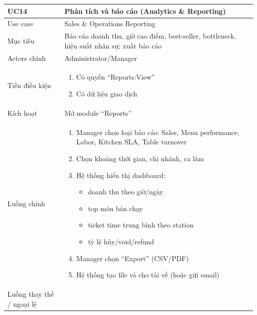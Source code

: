 \begin{longtable}{|>{\raggedright\arraybackslash}p{}|>{\raggedright\arraybackslash}p{}|}
\hline
\textbf{UC14} & \textbf{Phân tích và báo cáo (Analytics \& Reporting)} \\
\hline
Use case & Sales \& Operations Reporting \\
\hline
Mục tiêu & Báo cáo doanh thu, giờ cao điểm, best-seller, bottleneck, hiệu suất nhân sự; xuất báo cáo \\
\hline
Actors chính & Administrator/Manager \\
\hline
Tiền điều kiện &
\vspace{-0.5em}
\begin{enumerate}[leftmargin=*]
\item Có quyền “Reports:View”
\item Có dữ liệu giao dịch
\end{enumerate}
\vspace{-0.5em}
\\
\hline
Kích hoạt & Mở module “Reports” \\
\hline
Luồng chính &
\vspace{-0.5em}
\begin{enumerate}[leftmargin=*]
\item Manager chọn loại báo cáo: Sales, Menu performance, Labor, Kitchen SLA, Table turnover
\item Chọn khoảng thời gian, chi nhánh, ca làm
\item Hệ thống hiển thị dashboard:
\vspace{-0.5em}
\begin{itemize}[leftmargin=*]
\item doanh thu theo giờ/ngày
\item top món bán chạy
\item ticket time trung bình theo station
\item tỷ lệ hủy/void/refund
\end{itemize}
\vspace{-0.5em}
\item Manager chọn “Export” (CSV/PDF)
\item Hệ thống tạo file và cho tải về (hoặc gửi email)
\end{enumerate}
\vspace{-0.5em}
\\
\hline
Luồng thay thế / ngoại lệ &
\vspace{-0.5em}

\end{longtable}
